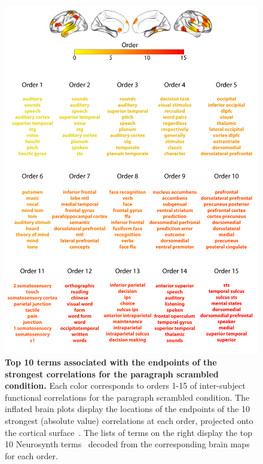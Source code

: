 \documentclass{article}
\begin{document}
\begin{figure}[p!]
\centering
\includegraphics[width=\textwidth]{figs/supp_15_paragraph}
\caption{\small \textbf{Top 10 terms associated with the endpoints of the
      strongest correlations for the paragraph scrambled condition.}  Each color corresponds to orders 1-15 of
    inter-subject functional correlations for the paragraph scrambled condition. The inflated brain plots
    display the locations of the endpoints of the 10 strongest
    (absolute value) correlations at each order, projected onto the
    cortical surface~\citep{CombEtal19}.  The lists of terms on the
    right display the top 10 Neurosynth terms~\citep{RubiEtal17}
    decoded from the corresponding brain maps for each order.}
\label{fig:paragraph}
\end{figure}
\end{document}
